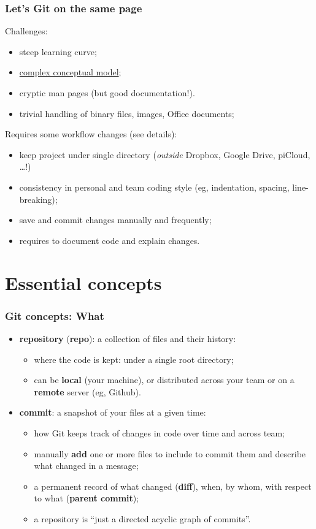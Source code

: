 \documentclass[10pt,svgnames]{beamer}
\begin{document}
\begin{frame}
\frametitle{Let's Git on the same page}
\label{git_cons}

Challenges:
\begin{itemize}
  \item steep learning curve;
  \item \hyperlink{xkcd_git}{complex conceptual model};
  \item cryptic man pages (but good documentation!).
  \item trivial handling of binary files, images, Office documents;
\end{itemize}

\medskip
\pause 

Requires some workflow changes (\hypertarget{style}{see details}):
\begin{itemize}
  \item keep project under single directory (\emph{outside} Dropbox, Google Drive, piCloud, \ldots!)
  \item consistency in personal and team coding style (eg, indentation, spacing, line-breaking);
  \item save and commit changes manually and frequently;
  \item requires to document code and explain changes.
\end{itemize}
\end{frame}


\section{Essential concepts}
\begin{frame}
\frametitle{Git concepts: What}
    
\begin{itemize}[<+->]
\item \textbf{repository} (\textbf{repo}): a collection of files and their history:
\begin{itemize}
   \item where the code is kept: under a single root directory;
   \item can be \textbf{local} (your machine), or distributed across your team or on a \textbf{remote} server (eg, Github).
 \end{itemize}

\item \textbf{commit}: a snapshot of your files at a given time:
\begin{itemize}
  \item how Git keeps track of changes in code over time and across team;
  \item manually \textbf{add} one or more files to include to commit them and describe what changed in a message;
  \item a permanent record of what changed (\textbf{diff}), when, by whom, with respect to what (\textbf{parent commit});
  \item a repository is “just a directed acyclic graph of commits”.
\end{itemize}
\end{itemize}
\end{frame}
\end{document}
